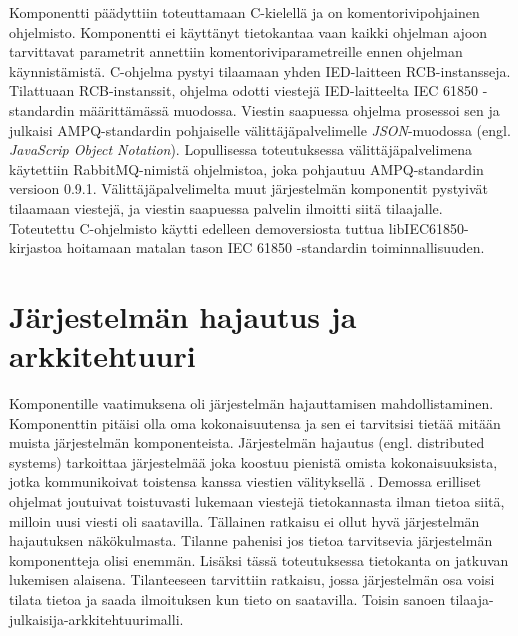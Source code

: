 Komponentti päädyttiin toteuttamaan C-kielellä ja on komentorivipohjainen ohjelmisto. Komponentti ei käyttänyt tietokantaa vaan kaikki ohjelman ajoon tarvittavat parametrit annettiin komentoriviparametreille ennen ohjelman käynnistämistä. C-ohjelma pystyi tilaamaan yhden IED-laitteen RCB-instansseja. Tilattuaan RCB-instanssit, ohjelma odotti viestejä IED-laitteelta IEC 61850 -standardin määrittämässä muodossa. Viestin saapuessa ohjelma prosessoi sen ja julkaisi AMPQ-standardin pohjaiselle välittäjäpalvelimelle \emph{JSON}-muodossa (engl. \emph{JavaScrip Object Notation}). Lopullisessa toteutuksessa välittäjäpalvelimena käytettiin RabbitMQ-nimistä ohjelmistoa, joka pohjautuu AMPQ-standardin versioon 0.9.1. Välittäjäpalvelimelta muut järjestelmän komponentit pystyivät tilaamaan viestejä, ja viestin saapuessa palvelin ilmoitti siitä tilaajalle. Toteutettu C-ohjelmisto käytti edelleen demoversiosta tuttua libIEC61850-kirjastoa hoitamaan matalan tason IEC 61850 -standardin toiminnallisuuden.


\section{Järjestelmän hajautus ja arkkitehtuuri}
\label{ch:järjestelmän-hajautus-ja-arkkitehtuuri}
Komponentille vaatimuksena oli järjestelmän hajauttamisen mahdollistaminen. Komponenttin pitäisi olla oma kokonaisuutensa ja sen ei tarvitsisi tietää mitään muista järjestelmän komponenteista.  Järjestelmän hajautus (engl. distributed systems) tarkoittaa järjestelmää joka koostuu pienistä omista kokonaisuuksista, jotka kommunikoivat toistensa kanssa viestien välityksellä \cite{distributed-systems-concepts-and-design}. Demossa erilliset ohjelmat joutuivat toistuvasti lukemaan viestejä tietokannasta ilman tietoa siitä, milloin uusi viesti oli saatavilla. Tällainen ratkaisu ei ollut hyvä järjestelmän hajautuksen näkökulmasta. Tilanne pahenisi jos tietoa tarvitsevia järjestelmän komponentteja olisi enemmän. Lisäksi tässä toteutuksessa tietokanta on jatkuvan lukemisen alaisena. Tilanteeseen tarvittiin ratkaisu, jossa järjestelmän osa voisi tilata tietoa ja saada ilmoituksen kun tieto on saatavilla. Toisin sanoen tilaaja-julkaisija-arkkitehtuurimalli.

